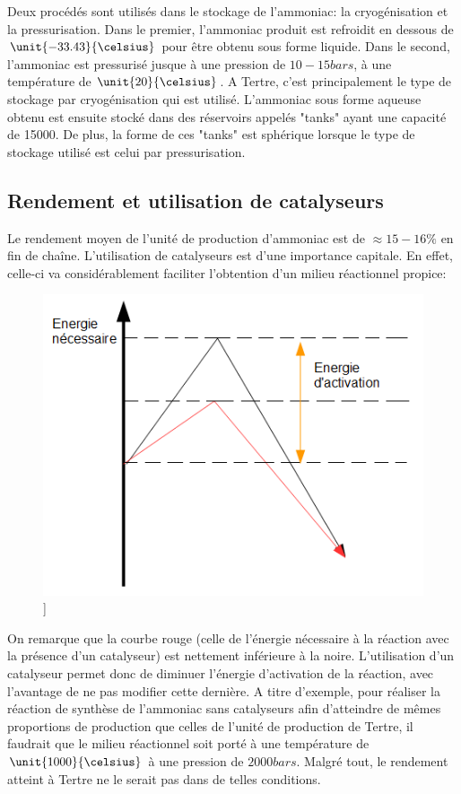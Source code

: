 Deux procédés sont utilisés dans le stockage de l'ammoniac: la cryogénisation et la pressurisation. Dans le premier, l'ammoniac produit est refroidit en dessous de $\unit{-33.43}{\celsius}$ pour être obtenu sous forme liquide. Dans le second, l'ammoniac est pressurisé jusque à une pression de $\unit{10-15}{bars}$, à une température de $\unit{20}{\celsius}$. A Tertre, c'est principalement le type de stockage par cryogénisation qui est utilisé. L'ammoniac sous forme aqueuse obtenu est ensuite stocké dans des réservoirs appelés "tanks" ayant une capacité de \unit{15000}{\tonne}. De plus, la forme de ces "tanks" est sphérique lorsque le type de stockage utilisé est celui par pressurisation.


\subsection{Rendement et utilisation de catalyseurs}
Le rendement moyen de l'unité de production d'ammoniac est de $\approx 15-16\%$ en fin de chaîne. L'utilisation de catalyseurs est d'une importance capitale. En effet, celle-ci va considérablement faciliter l'obtention d'un milieu réactionnel propice:

\begin{figure} [h]
\begin{center}
\includegraphics[scale=0.5]{schrend}]
\end{center}
\end{figure}

On remarque que la courbe rouge (celle de l'énergie nécessaire à la réaction avec la présence d'un catalyseur) est nettement inférieure à la noire. L'utilisation d'un catalyseur permet donc de diminuer l'énergie d'activation de la réaction, avec l'avantage de ne pas modifier cette dernière. A titre d'exemple, pour réaliser la réaction de synthèse de l'ammoniac sans catalyseurs afin d'atteindre de mêmes proportions de production que celles de l'unité de production de Tertre, il faudrait que le milieu réactionnel soit porté à une température de $\unit{1000}{\celsius}$ à une pression de $\unit{2000}{bars}$. Malgré tout, le rendement atteint à Tertre ne le serait pas dans de telles conditions.


